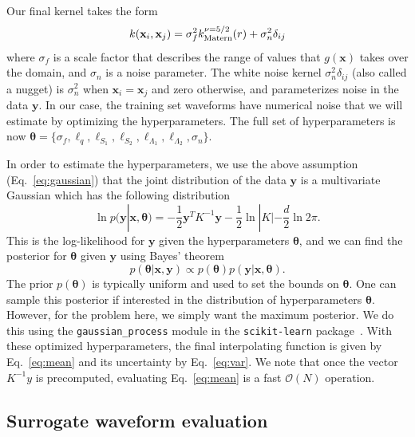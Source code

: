 \documentclass[prd,aps,letter,twocolumn,floatfix,notitlepage,nofootinbib]{revtex4-1}
\def\bx{\mathbf{x}}
\def\by{\mathbf{y}}
\def\btheta{\boldsymbol{\theta}}
\begin{document}
Our final kernel takes the form
\begin{equation}
k(\bx_i, \bx_j) = \sigma_f^2 k_{\rm Matern}^{\nu=5/2}(r) + \sigma_n^2 \delta_{ij}
\end{equation}
where $\sigma_f$ is a scale factor that describes the range of values that $g(\bx)$ takes over the domain, and $\sigma_n$ is a noise parameter. The white noise kernel $\sigma_n^2 \delta_{ij}$ (also called a nugget) is $\sigma_n^2$ when $\bx_i = \bx_j$ and zero otherwise, and parameterizes noise in the data $\by$. In our case, the training set waveforms have numerical noise that we will estimate by optimizing the hyperparameters. The full set of hyperparameters is now  $\btheta = \{\sigma_f, \ell_q, \ell_{S_1}, \ell_{S_2}, \ell_{\Lambda_1}, \ell_{\Lambda_2}, \sigma_n\}$.

In order to estimate the hyperparameters, we use the above assumption (Eq.~\eqref{eq:gaussian}) that the joint distribution of 
the data ${\bm y}$ is a multivariate Gaussian which has the following distribution
\begin{equation}
\ln p({\bm y} | {\bm x}, {\bm \theta}) = -\frac{1}{2}{\bm y}^T K^{-1} {\bm y} - \frac{1}{2} \ln |K| - \frac{d}{2} \ln 2\pi.
\end{equation}
This is the log-likelihood for ${\bm y}$ given the hyperparameters ${\bm \theta}$, and we can find the posterior for ${\bm \theta}$
given ${\bm y}$ using Bayes' theorem
\begin{equation}
p({\bm \theta} | {\bm x}, {\bm y}) \propto p({\bm \theta}) p({\bm y} | {\bm x}, {\bm \theta}).
\end{equation}
The prior $p({\bm \theta})$ is typically uniform and used to set the bounds on ${\bm \theta}$. One can sample this posterior if interested in the distribution of hyperparameters $\btheta$. However, for the problem here, we simply want the maximum posterior. We do this using the \texttt{gaussian\_process} module in the \texttt{scikit-learn} package~\cite{scikit-learn}. With these optimized hyperparameters, the final interpolating function is given by Eq.~\eqref{eq:mean} and its uncertainty by Eq.~\eqref{eq:var}. We note that once the vector $K^{-1}y$ is precomputed, evaluating Eq.~\eqref{eq:mean} is a fast $\mathcal{O}(N)$ operation.


\subsection{Surrogate waveform evaluation}
\end{document}
